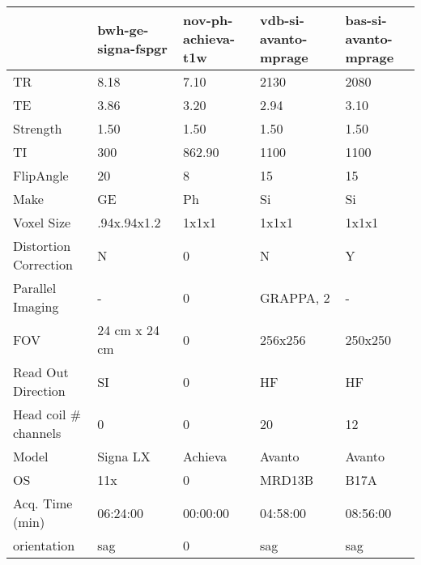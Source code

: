 \begin{table}
[]
\centering
\begin{tabular}{lllll}
\toprule
{} & bwh-ge-signa-fspgr & nov-ph-achieva-t1w & vdb-si-avanto-mprage & bas-si-avanto-mprage \\
\midrule
TR                    &               8.18 &               7.10 &                 2130 &                 2080 \\
TE                    &               3.86 &               3.20 &                 2.94 &                 3.10 \\
Strength              &               1.50 &               1.50 &                 1.50 &                 1.50 \\
TI                    &                300 &             862.90 &                 1100 &                 1100 \\
FlipAngle             &                 20 &                  8 &                   15 &                   15 \\
Make                  &                 GE &                 Ph &                   Si &                   Si \\
Voxel Size            &        .94x.94x1.2 &              1x1x1 &                1x1x1 &                1x1x1 \\
Distortion Correction &                  N &                  0 &                    N &                    Y \\
Parallel Imaging      &                  - &                  0 &            GRAPPA, 2 &                    - \\
FOV                   &      24 cm x 24 cm &                  0 &              256x256 &              250x250 \\
Read Out Direction    &                 SI &                  0 &                   HF &                   HF \\
Head coil \# channels  &                  0 &                  0 &                   20 &                   12 \\
Model                 &           Signa LX &            Achieva &               Avanto &               Avanto \\
OS                    &                11x &                  0 &               MRD13B &                 B17A \\
Acq. Time (min)       &           06:24:00 &           00:00:00 &             04:58:00 &             08:56:00 \\
orientation           &                sag &                  0 &                  sag &                  sag \\

\end{tabular}
\end{table}
